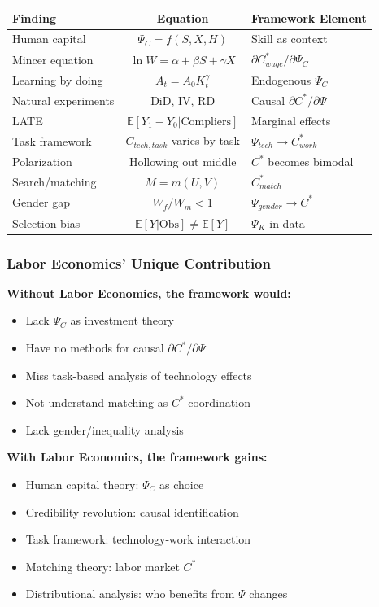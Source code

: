 \begin{center}
\renewcommand{\arraystretch}{1.5}
\begin{tabular}{|l|c|l|}
\hline
\textbf{Finding} & \textbf{Equation} & \textbf{Framework Element} \\
\hline
Human capital & $\Psi_C = f(S, X, H)$ & Skill as context \\
\hline
Mincer equation & $\ln W = \alpha + \beta S + \gamma X$ & $\partial C^*_{wage}/\partial \Psi_C$ \\
\hline
Learning by doing & $A_t = A_0 K_t^\gamma$ & Endogenous $\Psi_C$ \\
\hline
Natural experiments & DiD, IV, RD & Causal $\partial C^*/\partial \Psi$ \\
\hline
LATE & $\mathbb{E}[Y_1-Y_0 | \text{Compliers}]$ & Marginal effects \\
\hline
Task framework & $C_{tech, task}$ varies by task & $\Psi_{tech} \to C^*_{work}$ \\
\hline
Polarization & Hollowing out middle & $C^*$ becomes bimodal \\
\hline
Search/matching & $M = m(U,V)$ & $C^*_{match}$ \\
\hline
Gender gap & $W_f/W_m < 1$ & $\Psi_{gender} \to C^*$ \\
\hline
Selection bias & $\mathbb{E}[Y|\text{Obs}] \neq \mathbb{E}[Y]$ & $\Psi_K$ in data \\
\hline
\end{tabular}
\end{center}

\subsubsection{Labor Economics' Unique Contribution}

\textbf{Without Labor Economics, the framework would:}
\begin{itemize}
    \item Lack $\Psi_C$ as investment theory
    \item Have no methods for causal $\partial C^*/\partial \Psi$
    \item Miss task-based analysis of technology effects
    \item Not understand matching as $C^*$ coordination
    \item Lack gender/inequality analysis
\end{itemize}

\textbf{With Labor Economics, the framework gains:}
\begin{itemize}
    \item Human capital theory: $\Psi_C$ as choice
    \item Credibility revolution: causal identification
    \item Task framework: technology-work interaction
    \item Matching theory: labor market $C^*$
    \item Distributional analysis: who benefits from $\Psi$ changes
\end{itemize}

